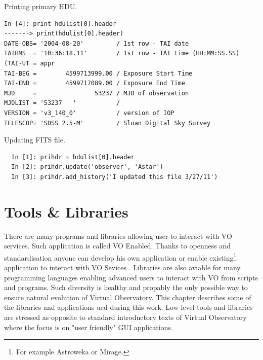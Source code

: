 Printing primary HDU.

\begin{lstlisting}
In [4]: print hdulist[0].header
-------> print(hdulist[0].header)
DATE-OBS= '2004-08-20'         / 1st row - TAI date                             
TAIHMS  = '10:36:18.11'        / 1st row - TAI time (HH:MM:SS.SS) (TAI-UT = appr
TAI-BEG =        4599713999.00 / Exposure Start Time                            
TAI-END =        4599717089.00 / Exposure End Time                              
MJD     =                53237 / MJD of observation                             
MJDLIST = '53237   '           /                                                
VERSION = 'v3_140_0'           / version of IOP                                 
TELESCOP= 'SDSS 2.5-M'         / Sloan Digital Sky Survey
\end{lstlisting}

Updating FITS file.

\begin{lstlisting}
  In [1]: prihdr = hdulist[0].header
  In [2]: prihdr.update('observer', 'Astar')
  In [3]: prihdr.add_history('I updated this file 3/27/11')
\end{lstlisting}

\section{Tools \& Libraries}
There are many programs and libraries allowing user to interact with
VO services. Such application is called VO Enabled. Thanks to openness
and standardisation anyone can develop his own application or enable
existing\footnote{For example Astroweka or Mirage.} application to
interact with VO Sevices . Libraries are also aviable for many
programming languages enabling advanced users to interact with VO from
scripts and programs. Such diversity is healthy and propably the only
possible way to ensure natural evolution of Virtual Observatory. This
chapter describes some of the libraries and applications ued during
this work. Low level tools and libraries are stressed as opposite to
standard introductory texts of Virtual Observatory where the focus is
on "user friendly" GUI applications.



